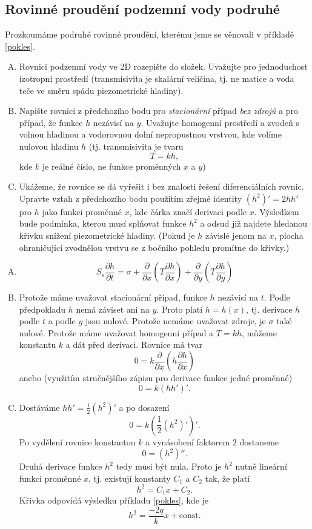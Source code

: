 \subsection{Rovinné proudění podzemní vody podruhé}

Prozkoumáme podruhé rovinné proudění, kterému jsme se věnovali v
příkladě \ref{pokles}.

\begin{enumerate}[A)]
\item Rovnici podzemní vody ve 2D rozepište do složek. Uvažujte pro jednoduchost izotropní prostředí (transmisivita je skalární veličina, tj. ne matice a voda teče ve směru spádu piezometrické hladiny).
\item Napište rovnici z předchozího bodu pro \textit{stacionární} případ \textit{bez zdrojů} a pro případ, že funkce $h$ nezávisí na $y$. Uvažujte homogenní prostředí a zvodeň s volnou hladinou a vodorovnou dolní nepropustnou vrstvou, kde volíme nulovou hladinu $h$ (tj. transmisivita je tvaru $$T=kh,$$ kde $k$ je reálné číslo, ne funkce proměnných $x$ a $y$)
\item Ukážeme, že rovnice se dá vyřešit i bez znalosti řešení diferenciálních rovnic. Upravte vztah z předchozího bodu použitím zřejmé identity
  $(h^2)'=2 h h'$
  pro $h$ jako funkci proměnné  $x$, kde čárka značí derivaci podle $x$. Výsledkem bude podmínka, kterou musí splňovat funkce $h^2$ a odsud již najdete hledanou křivku snížení piezometrické hladiny. (Pokud je $h$ závislé jenom na $x$, plocha ohraničující zvodnělou vrstvu se z bočního pohledu promítne do křivky.)
\end{enumerate}


\reseni
\begin{enumerate}[A)]
\item $$S_s\frac{\partial h}{\partial t}=\sigma + \frac{\partial }{\partial x}\left (T \frac{\partial h}{\partial x} \right)
  +
  \frac{\partial }{\partial y}\left (T \frac{\partial h}{\partial y} \right)
  $$
\item Protože máme uvažovat stacionární případ, funkce $h$ nezávisí na $t$. Podle předpokladu $h$ nemá záviset ani na $y$. Proto platí $h=h(x)$, tj. derivace $h$ podle $t$ a podle $y$ jsou nulové.
  Protože nemáme uvažovat zdroje, je $\sigma$ také nulové. Protože máme uvažovat homogenní případ a $T=kh$, můžeme konstantu $k$ a dát před derivaci.  Rovnice má tvar
  $$0=k\frac{\partial }{\partial x}\left ( h\frac{\partial h}{\partial x} \right)
  $$
  anebo (využitím stručnějšího zápisu pro derivace funkce jedné proměnné)
  $$0=k(h h')'.$$
\item Dostáváme $h h' = \frac12 (h^2)'$ a po dosazení
$$0=k\left(\frac 12 (h^2)'\right )'.$$ Po vydělení rovnice konstantou $k$ a vynásobení faktorem $2$ dostaneme 
  $$0=(h^2)''.$$
  Druhá derivace funkce $h^2$ tedy musí být nula. Proto je $h^2$ nutně lineární funkcí proměnné $x$, tj. existují konstanty $C_1$ a $C_2$ tak, že platí $$h^2=C_1x+C_2.$$
  Křivka odpovídá výsledku příkladu  \ref{pokles}, kde je
  $$h^2=\frac{-2q}k x + \text{const.}$$
\end{enumerate}
\konec

